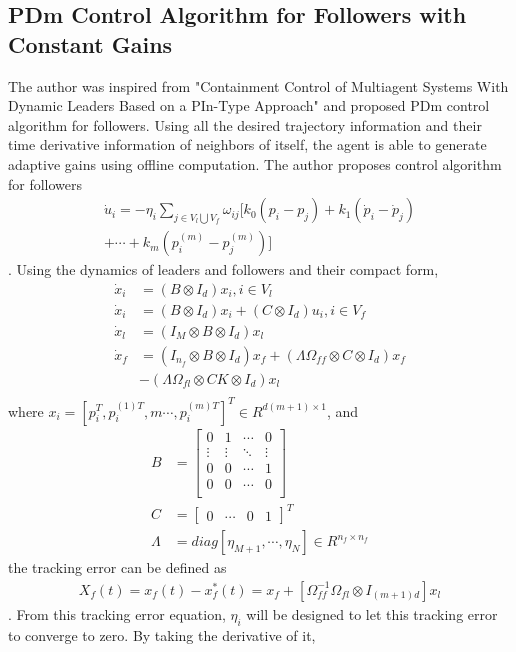 \subsection*{PDm Control Algorithm for Followers with Constant Gains} \label{PDm_Control_Algorithm_Followers_with_constant_gains}
 The author was inspired from "Containment Control of Multiagent Systems With Dynamic Leaders Based on a PIn-Type Approach" and proposed PDm control algorithm for followers. Using all the desired trajectory information and their time derivative information of neighbors of itself, the agent is able to generate adaptive gains using offline computation. The author proposes control algorithm for followers
 \begin{align*}
   \dot u_i = -\eta_i \sum_{j \in V_l\bigcup V_f } \omega_{ij}[k_0(p_i-p_j) + k_1(\dot p_i-\dot p_j) \\+ \cdots +k_m( p_i^{(m)}- p_j^{(m)})]
 \end{align*}.
 Using the dynamics of leaders and followers and their compact form,
 \begin{align*}
   \dot x_i & = (B \otimes I_d)x_i,  i \in V_l\\
   \dot x_i & = (B \otimes I_d)x_i + (C \otimes I_d)u_i,  i \in V_f\\
   \dot x_l & = (I_M\otimes B \otimes I_d)x_l\\
   \dot x_f & = (I_{n_f}\otimes B \otimes I_d)x_f + (\Lambda \Omega_{ff}\otimes C \otimes I_d)x_f\\
   &- (\Lambda \Omega_{fl} \otimes CK \otimes I_d) x_l\\
 \end{align*}
   where $x_i = [p_i^T,p_i^{(1)T},m  \cdots , p_i^{(m)T}]^T \in R^{d(m+1)\times 1}$, and
 \begin{align*}
   B &= \begin{bmatrix}
      0 & 1 & \cdots & 0\\
      \vdots & \vdots &\ddots &\vdots\\
      0 & 0 & \cdots &1\\
      0 & 0 & \cdots &0 \\
   \end{bmatrix}\\
   C &= \begin{bmatrix}
      0 & \cdots & 0 & 1 
   \end{bmatrix}^T\\
   \Lambda &= diag{[\eta_{M+1}, \cdots , \eta_{N}]} \in R ^{n_f \times n_f}
 \end{align*}
 the tracking error can be defined as
 \begin{align*}
   X_f(t) = x_f(t) - x_f^*(t) = x_f + [\Omega_{ff}^{-1} \Omega_{fl} \otimes I_{(m+1)d}]x_l
 \end{align*}.
 From this tracking error equation, $\eta_i$ will be designed to let this tracking error to converge to zero. By taking the derivative of it,

